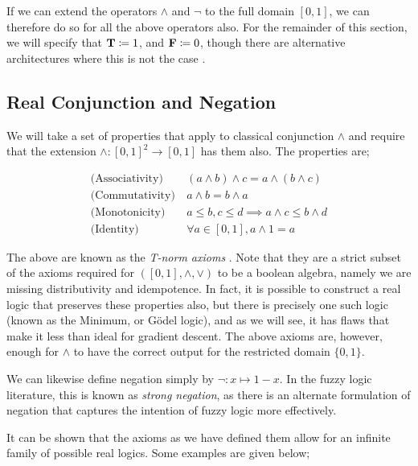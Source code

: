 If we can extend the operators $\land$ and $\neg$ to the full domain $[0,1]$, we can therefore do so for all the above operators also. For the remainder of this section, we will specify that $\textbf{T} \coloneqq 1$, and $\textbf{F} \coloneqq 0$, though there are alternative architectures where this is not the case \cite{embeddedgoogle}.

\subsection{Real Conjunction and Negation}

We will take a set of properties that apply to classical conjunction $\land$ and require that the extension $\land : [0,1]^2 \to [0,1]$ has them also. The properties are;

$$
\begin{aligned}
\text{(Associativity)}&\ (a \land b) \land c = a \land (b \land c) \\
\text{(Commutativity)}&\ a \land b = b \land a \\
\text{(Monotonicity)}&\ a \leq b, c \leq d \implies a \land c \leq b \land d \\
\text{(Identity)}&\ \forall a \in [0,1], a \land 1 = a
\end{aligned}
$$

The above are known as the \textit{T-norm axioms} \cite{tnorms}. Note that they are a strict subset of the axioms required for $([0,1], \land, \lor)$ to be a boolean algebra, namely we are missing distributivity and idempotence. In fact, it is possible to construct a real logic that preserves these properties also, but there is precisely one such logic (known as the Minimum, or Gödel logic), and as we will see, it has flaws that make it less than ideal for gradient descent. The above axioms are, however, enough for $\land$ to have the correct output for the restricted domain $\{0,1\}$. 

We can likewise define negation simply by $\lnot : x \mapsto 1 - x$. In the fuzzy logic literature, this is known as \textit{strong negation}, as there is an alternate formulation of negation that captures the intention of fuzzy logic more effectively.

It can be shown that the axioms as we have defined them allow for an infinite family of possible real logics. Some examples are given below;

